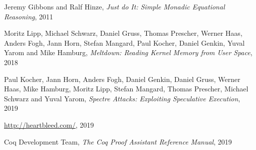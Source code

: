 \documentclass[declaration,inz,english,shortabstract]{iithesis}
\begin{document}
\begin{thebibliography}{1}

        Jeremy Gibbons and Ralf Hinze,
        \textit{Just do It: Simple Monadic Equational Reasoning},
        2011

        Moritz Lipp, Michael Schwarz, Daniel Gruss, Thomas Prescher, Werner Haas, Anders Fogh, Jann Horn, Stefan Mangard, Paul Kocher, Daniel Genkin, Yuval Yarom and Mike Hamburg,
        \textit{Meltdown: Reading Kernel Memory from User Space},
        2018

        Paul Kocher, Jann Horn, Anders Fogh, Daniel Genkin, Daniel Gruss, Werner Haas, Mike Hamburg, Moritz Lipp, Stefan Mangard, Thomas Prescher, Michael Schwarz and Yuval Yarom,
        \textit{Spectre Attacks: Exploiting Speculative Execution},
        2019
    
        \url{http://heartbleed.com/}, 2019

        Coq Development Team,
        \textit{The Coq Proof Assistant Reference Manual},
        2019

\end{thebibliography}

\end{document}
